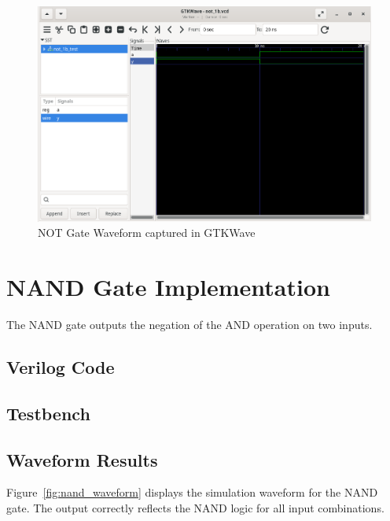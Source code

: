 \documentclass[12pt]{report}
\begin{document}
\begin{figure}[H]
    \centering
    \includegraphics[width=1.0\textwidth]{figs/NOT_GATE_WAVEFORM.png}
    \caption{NOT Gate Waveform captured in GTKWave}
    \label{fig:not_waveform}
\end{figure}

\chapter{NAND Gate Implementation}

The NAND gate outputs the negation of the AND operation on two inputs.

\section{Verilog Code}



\section{Testbench}



\section{Waveform Results}

Figure~\ref{fig:nand_waveform} displays the simulation waveform for the NAND gate. The output correctly reflects the NAND logic for all input combinations.
\end{document}
